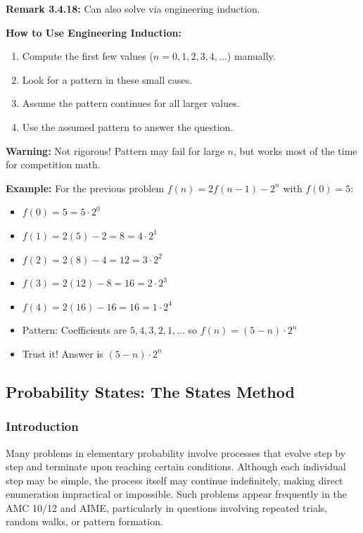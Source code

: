 \documentclass[12pt]{extarticle}
\begin{document}
\textbf{Remark 3.4.18:} Can also solve via engineering induction.

\begin{tcolorbox}[colback=yellow!10!white,colframe=orange!75!black,title=Engineering Induction (Pattern Guessing)]
\textbf{How to Use Engineering Induction:}
\begin{enumerate}
    \item Compute the first few values ($n=0,1,2,3,4,...$) manually.
    \item Look for a pattern in these small cases.
    \item Assume the pattern continues for all larger values.
    \item Use the assumed pattern to answer the question.
\end{enumerate}
\textbf{Warning:} Not rigorous! Pattern may fail for large $n$, but works most of the time for competition math.

\textbf{Example:} For the previous problem $f(n) = 2f(n-1) - 2^n$ with $f(0)=5$:
\begin{itemize}
    \item $f(0) = 5 = 5 \cdot 2^0$
    \item $f(1) = 2(5) - 2 = 8 = 4 \cdot 2^1$
    \item $f(2) = 2(8) - 4 = 12 = 3 \cdot 2^2$
    \item $f(3) = 2(12) - 8 = 16 = 2 \cdot 2^3$
    \item $f(4) = 2(16) - 16 = 16 = 1 \cdot 2^4$
    \item Pattern: Coefficients are $5,4,3,2,1,\ldots$ so $f(n) = (5-n) \cdot 2^n$
    \item Trust it! Answer is $\boxed{(5-n) \cdot 2^n}$
\end{itemize}
\end{tcolorbox}


\newpage


\subsection{Probability States: The States Method}

\subsubsection*{Introduction}

Many problems in elementary probability involve processes that evolve step by step and terminate upon reaching certain conditions. Although each individual step may be simple, the process itself may continue indefinitely, making direct enumeration impractical or impossible. Such problems appear frequently in the AMC 10/12 and AIME, particularly in questions involving repeated trials, random walks, or pattern formation.
\end{document}
